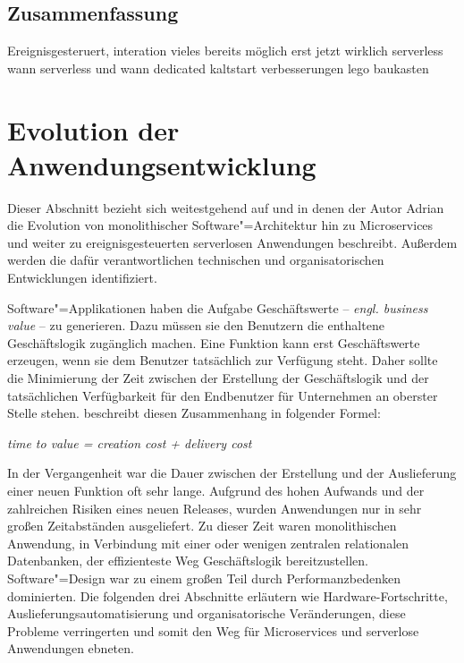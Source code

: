 \subsection{Zusammenfassung}

Ereignisgesteruert, interation
vieles bereits möglich
erst jetzt wirklich serverless
wann serverless und wann dedicated
kaltstart verbesserungen
lego baukasten

\section{Evolution der Anwendungsentwicklung}

Dieser Abschnitt bezieht sich weitestgehend auf \cite{Cock16EvoFunc} und \cite{Cock17ShrinkingMS} in denen der Autor Adrian \citeauthor{Cock16EvoFunc} die Evolution von monolithischer Software"=Architektur hin zu Microservices und weiter zu ereignisgesteuerten serverlosen Anwendungen beschreibt. Außerdem werden die dafür verantwortlichen technischen und organisatorischen Entwicklungen identifiziert.

Software"=Applikationen haben die Aufgabe Geschäftswerte -- \textit{engl. business value} -- zu generieren. Dazu müssen sie den Benutzern die enthaltene Geschäftslogik zugänglich machen. Eine Funktion kann erst Geschäftswerte erzeugen, wenn sie dem Benutzer tatsächlich zur Verfügung steht. Daher sollte die Minimierung der Zeit zwischen der Erstellung der Geschäftslogik und der tatsächlichen Verfügbarkeit für den Endbenutzer für Unternehmen an oberster Stelle stehen. \citeauthor{Cock16EvoFunc} beschreibt diesen Zusammenhang in folgender Formel:

\begin{center}
\textit{time to value = creation cost + delivery cost}
\end{center}

In der Vergangenheit war die Dauer zwischen der Erstellung und der Auslieferung einer neuen Funktion oft sehr lange. Aufgrund des hohen Aufwands und der zahlreichen Risiken eines neuen Releases, wurden Anwendungen nur in sehr großen Zeitabständen ausgeliefert. Zu dieser Zeit waren monolithischen Anwendung, in Verbindung mit einer oder wenigen zentralen relationalen Datenbanken, der effizienteste Weg Geschäftslogik bereitzustellen. Software"=Design war zu einem großen Teil durch Performanzbedenken dominierten. Die folgenden drei Abschnitte erläutern wie Hardware-Fortschritte, Auslieferungsautomatisierung und organisatorische Veränderungen, diese Probleme verringerten und somit den Weg für Microservices und serverlose Anwendungen ebneten.

